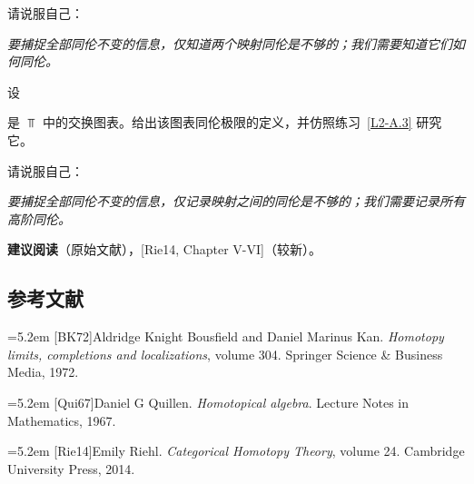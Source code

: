\nitem\label{L2-A.4} 请说服自己：
\begin{center}
\emph{要捕捉全部同伦不变的信息，仅知道两个映射同伦是不够的；我们需要知道它们如何同伦。}
\end{center}

\begin{exercise}\label{L2-A.5}
设
\begin{center}
\end{center}
是 $\Top$ 中的交换图表。给出该图表同伦极限的定义，并仿照练习~\ref{L2-A.3} 研究它。
\end{exercise}

\nitem\label{L2-A.6} 请说服自己：
\begin{center}
\emph{要捕捉全部同伦不变的信息，仅记录映射之间的同伦是不够的；我们需要记录所有高阶同伦。}
\end{center}

\nitem\label{L2-A.7} \textbf{建议阅读}（原始文献），[Rie14, Chapter V-VI]（较新）。

\subsection*{参考文献}
\par\noindent\hangindent=5.2em [BK72]\hspace{0.6em}Aldridge Knight Bousfield and Daniel Marinus Kan. \emph{Homotopy limits, completions and localizations}, volume 304. Springer Science \& Business Media, 1972.
\par\noindent\hangindent=5.2em [Qui67]\hspace{0.6em}Daniel G Quillen. \emph{Homotopical algebra}. Lecture Notes in Mathematics, 1967.
\par\noindent\hangindent=5.2em [Rie14]\hspace{0.6em}Emily Riehl. \emph{Categorical Homotopy Theory}, volume 24. Cambridge University Press, 2014.
